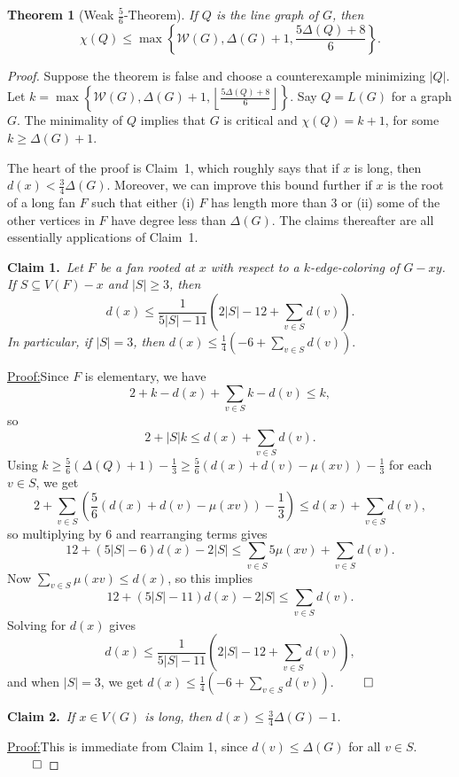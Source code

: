 \documentclass[12pt]{article}
\theoremstyle{plain}
\newtheorem{thm}{Theorem}
\theoremstyle{definition}
\theoremstyle{remark}
\newcommand{\fancy}[1]{\mathcal{#1}}
\newcommand{\W}{\fancy{W}}
\newcommand{\set}[1]{\left\{ #1 \right\}}
\newcommand{\card}[1]{\left|#1\right|}
\newcommand{\floor}[1]{\left\lfloor#1\right\rfloor}
\newcommand{\parens}[1]{\left( #1 \right)}
\newcommand{\claim}[2]{{\noindent\bf Claim #1.}~{\it #2}~~}
\newenvironment{claimproof}[1]{\par\noindent\underline{Proof:}\space#1}{\leavevmode\unskip\penalty9999
\hbox{}\nobreak\hfill\quad\hbox{$\qed$}}
\begin{document}
\begin{thm}[Weak $\frac56$-Theorem]
If $Q$ is the line graph of $G$, then
\[\chi(Q) \le \max\set{\W(G), \Delta(G) + 1, \frac{5\Delta(Q) + 8}{6}}.\]
\label{mainhelper}
\end{thm}
\begin{proof}
Suppose the theorem is false and choose a counterexample minimizing $\card{Q}$.
Let $k = \max\set{\W(G), \Delta(G) + 1, \floor{\frac{5\Delta(Q) + 8}{6}}}$. Say $Q =
L(G)$ for a graph $G$. The minimality of $Q$ implies that
$G$ is critical and $\chi(Q) = k+1$, for some $k \ge \Delta(G) + 1$.

The heart of the proof is Claim~1, which roughly says that if $x$ is long, then
$d(x)<\frac34\Delta(G)$. Moreover, we can improve this bound further if $x$ is
the root of a long fan $F$ such that either (i) $F$ has length more than 3 or (ii)
some of the other vertices in $F$ have degree less than $\Delta(G)$.  The claims
thereafter are all essentially applications of Claim~1.
\bigskip

\claim{1}{Let $F$ be a fan rooted at $x$ with respect to a $k$-edge-coloring of
$G - xy$.  If $S\subseteq V(F)-x$ and $\card{S} \ge 3$, then
\[d(x) \le \frac1{5\card{S}-11}\parens{2\card{S}-12 + \sum_{v \in S} d(v)}.\]
In particular, if $\card{S}=3$, then $d(x) \le \frac1{4}\parens{-6 + \sum_{v \in S}
d(v)}.$}
\begin{claimproof}
Since $F$ is elementary, we have
\[2 + k-d(x) + \sum_{v \in S} k - d(v) \le k,\]
so
\[2 + \card{S}k \le d(x) + \sum_{v \in S} d(v).\]
Using $k \ge \frac56(\Delta(Q) + 1) - \frac13 \ge \frac56(d(x) + d(v) - \mu(xv))
- \frac13$ for each $v
\in S$, we get
\[2 + \sum_{v \in S}\parens{\frac56(d(x) + d(v) - \mu(xv)) -\frac13} \le d(x) +
\sum_{v \in S} d(v),\]
so multiplying by 6 and rearranging terms gives
\[12 + \parens{5\card{S} - 6}d(x) - 2\card{S} \le \sum_{v \in S} 5\mu(xv) + \sum_{v \in S} d(v).\]
Now $\sum_{v \in S} \mu(xv) \le d(x)$, so this implies
\[12 + \parens{5\card{S} - 11}d(x) - 2\card{S} \le \sum_{v \in S} d(v).\]
Solving for $d(x)$ gives
\[d(x) \le \frac1{5\card{S}-11}\parens{2\card{S}-12 + \sum_{v \in S} d(v)},\]
and when $\card{S} = 3$, we get
$d(x) \le \frac14\parens{-6 + \sum_{v \in S} d(v)}.$
\end{claimproof}
\bigskip

\claim{2}{If $x \in V(G)$ is long, then $d(x) \le \frac34\Delta(G) - 1$.}

\begin{claimproof}
This is immediate from Claim 1, since $d(v)\le \Delta(G)$ for all $v\in S$.
\end{claimproof}
\bigskip


\end{proof}
\end{document}
